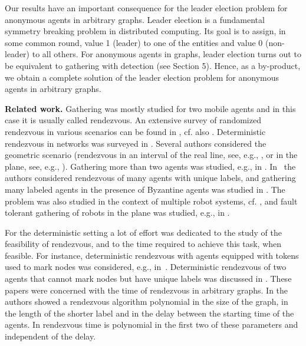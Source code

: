 \documentclass[11pt]{article}
\begin{document}
Our results have an important consequence for the leader election
problem for anonymous agents in arbitrary graphs.
Leader election \cite{Ly} is a fundamental symmetry breaking problem in distributed
computing. Its goal is to assign, in some common round, value 1 (leader) to one of the entities and value 0 (non-leader)
to all others.  For anonymous agents in graphs, leader election turns out to be equivalent to
gathering with detection (see Section 5). Hence, 
as a by-product, we obtain a complete solution of 
the leader election
problem for anonymous agents in arbitrary graphs.












\noindent
{\bf Related work.}
Gathering was mostly studied for two mobile agents and in this case it is usually called rendezvous.
An extensive survey of  randomized rendezvous in various scenarios  can be found in
\cite{alpern02b}, cf. also  \cite{alpern95a,alpern02a,anderson90,israeli}. 
Deterministic rendezvous in networks was surveyed in \cite{Pe}.
Several authors
considered the geometric scenario (rendezvous in an interval of the real line, see, e.g.,  \cite{baston01,gal99},
or in the plane, see, e.g., \cite{anderson98a,anderson98b}).
Gathering more than two agents was studied, e.g., 
in \cite{israeli,lim96}. In~\cite{YY} the authors considered 
rendezvous of many agents with unique labels, and gathering many labeled agents in the presence of Byzantine agents was studied in \cite{DPP}. 
The problem was also studied in the context of multiple robot systems, cf.
\cite{CP05,fpsw}, and fault tolerant gathering of robots in the plane was studied, e.g., in \cite{AP06,CP08}. 

For the deterministic setting a lot of effort was dedicated to the study of the feasibility of rendezvous, and to the time required to achieve this task, when feasible. For instance, deterministic rendezvous with agents equipped with tokens used to mark nodes was considered, e.g., in~\cite{KKSS}. Deterministic rendezvous of two agents that cannot mark nodes but have unique labels was discussed in \cite{DFKP,KM,TSZ14}.
These papers were concerned with the time of rendezvous in arbitrary
graphs. In \cite{DFKP} the authors showed a rendezvous algorithm polynomial in the size of the graph, in the length of the shorter
label and in the delay between the starting time of the agents. In \cite{KM,TSZ14} rendezvous time is polynomial in the first two of these parameters and independent of the delay.
\end{document}
